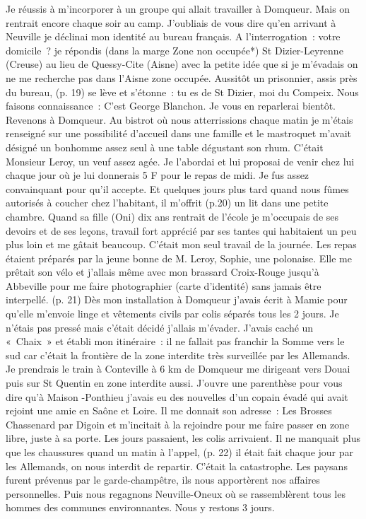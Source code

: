 \documentclass[a5paper,pagesize,10pt,bibtotoc,pointlessnumbers,
normalheadings,DIV=9,twoside=false]{scrbook}
\begin{document}
	Je réussis à m’incorporer à un groupe qui allait travailler à Domqueur. Mais on rentrait encore chaque soir au camp. J’oubliais de vous dire qu’en arrivant à Neuville je déclinai mon identité au bureau français. A l’interrogation : votre domicile ? je répondis (dans la marge Zone non occupée*) St Dizier-Leyrenne (Creuse) au lieu de Quessy-Cite (Aisne) avec la petite idée que si je m’évadais on ne me recherche pas dans l’Aisne zone occupée. Aussitôt un prisonnier, assis près du bureau, (p. 19) se lève et s’étonne : tu es de St Dizier, moi du Compeix. Nous faisons connaissance : C’est George Blanchon. Je vous en reparlerai bientôt.
	Revenons à Domqueur. Au bistrot où nous atterrissions chaque matin je m’étais renseigné sur une possibilité d’accueil dans une famille et le mastroquet m’avait désigné un bonhomme assez seul à une table dégustant son rhum. C’était Monsieur Leroy, un veuf assez agée.
	Je l’abordai et lui proposai de venir chez lui chaque jour où je lui donnerais 5 F pour le repas de midi. Je fus assez convainquant pour qu’il accepte. Et quelques jours plus tard quand nous fûmes autorisés à coucher chez l’habitant, il m’offrit (p.20) un lit dans une petite chambre. Quand sa fille (Oni) dix ans rentrait de l’école je m’occupais de ses devoirs et de ses leçons, travail fort apprécié par ses tantes qui habitaient un peu plus loin et me gâtait beaucoup. C’était mon seul travail de la journée. Les repas étaient préparés par la jeune bonne de M. Leroy, Sophie, une polonaise. Elle me prêtait son vélo et j’allais même avec mon brassard Croix-Rouge jusqu’à Abbeville pour me faire photographier (carte d’identité) sans jamais être interpellé. 
	(p. 21) Dès mon installation à Domqueur j’avais écrit à Mamie pour qu’elle m’envoie linge et vêtements civils par colis séparés tous les 2 jours. Je n’étais pas pressé mais c’était décidé j’allais m’évader. J’avais caché un « Chaix » et établi mon itinéraire : il ne fallait pas franchir la Somme vers le sud car c’était la frontière de la zone interdite très surveillée par les Allemands. Je prendrais le train à Conteville à 6 km de Domqueur me dirigeant vers Douai puis sur St Quentin en zone interdite aussi. J’ouvre une parenthèse pour vous dire qu’à Maison -Ponthieu j’avais eu des nouvelles d’un copain évadé qui avait rejoint une amie en Saône et Loire. Il me donnait son adresse : Les Brosses Chassenard par Digoin et m’incitait à la rejoindre pour me faire passer en zone libre, juste à sa porte.
	Les jours passaient, les colis arrivaient. Il ne manquait plus que les chaussures quand un matin à l’appel, (p. 22) il était fait chaque jour par les Allemands, on nous interdit de repartir. C’était la catastrophe. Les paysans furent prévenus par le garde-champêtre, ils nous apportèrent nos affaires personnelles. Puis nous regagnons Neuville-Oneux où se rassemblèrent tous les hommes des communes environnantes. Nous y restons 3 jours.
\end{document}

